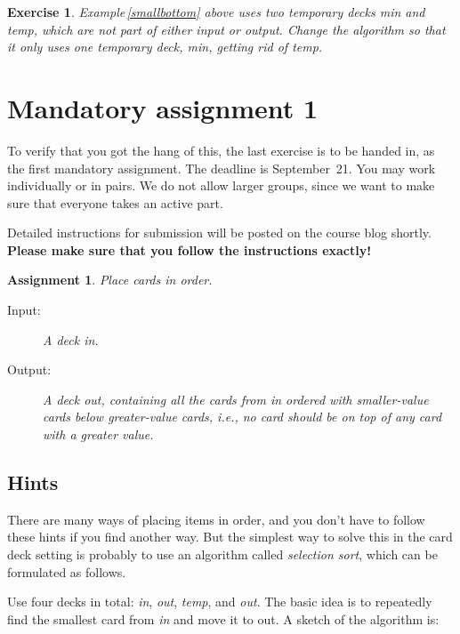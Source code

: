 \documentclass[a4paper,twoside]{tufte-handout}
\newtheorem{exercise}{Exercise}
\newtheorem{assignment}{Assignment}
\begin{document}
\begin{exercise}
  Example\,\ref{smallbottom} above uses two temporary decks \emph{min}
  and \emph{temp}, which are not part of either input or
  output. Change the algorithm so that it only uses one temporary
  deck, \emph{min}, getting rid of \emph{temp}.
\end{exercise}

\clearpage
\section{Mandatory assignment 1}

To verify that you got the hang of this, the last exercise is to be
handed in, as the first mandatory assignment. The deadline is
September~21. You may work individually or in pairs. We do not allow
larger groups, since we want to make sure that everyone takes an
active part.

Detailed instructions for submission will be posted on the course blog
shortly. \textbf{Please make sure that you follow the
  instructions exactly!}

\begin{assignment}
  Place cards in order.
  \begin{description}
  \item[Input:] A deck \emph{in}.
  \item[Output:] A deck \emph{out}, containing all the cards from
    \emph{in} ordered with smaller-value cards below greater-value
    cards, i.e., no card should be on top of any card with a greater
    value.
  \end{description}
\end{assignment}

 \subsection{Hints}\label{sec-hints}
 
 There are many ways of placing items in order, and you don't have to
 follow these hints if you find another way. But the simplest way to
 solve this in the card deck setting is probably to use an algorithm
 called \emph{selection sort}, which can be formulated as follows.

 Use four decks in total: \emph{in}, \emph{out}, \emph{temp}, and
 \emph{out}. The basic idea is to repeatedly find the smallest card
 from \emph{in} and move it to out. A sketch of the algorithm is:
\end{document}
